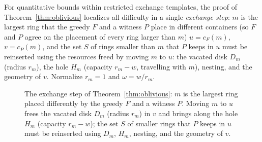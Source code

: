 \documentclass[11pt]{article}
\theoremstyle{definition}
\begin{document}
For quantitative bounds within restricted exchange templates, the proof of
Theorem~\ref{thm:oblivious} localizes all difficulty in a single
\emph{exchange step}: $m$ is the largest ring that the greedy $F$ and a
witness $P$ place in different containers (so $F$ and $P$ agree
on the placement of every ring larger than $m$) $u=c_F(m)$, $v=c_P(m)$, and the set
$S$ of rings smaller than $m$ that $P$ keeps in $u$ must be reinserted using
the resources freed by moving $m$ to $u$: the vacated disk $D_m$ (radius
$r_m$), the hole $H_m$ (capacity $r_m-w$, travelling with $m$), nesting, and
the geometry of $v$. Normalize $r_m=1$ and $\omega=w/r_m$.
\begin{figure}[ht]
\centering
{}
\caption{The exchange step of Theorem~\ref{thm:oblivious}: $m$ is the
largest ring placed differently by the greedy $F$ and a witness $P$.
Moving $m$ to $u$ frees the vacated disk $D_m$ (radius $r_m$) in $v$
and brings along the hole $H_m$ (capacity $r_m-w$); the set $S$ of
smaller rings that $P$ keeps in $u$ must be reinserted using $D_m$,
$H_m$, nesting, and the geometry of $v$.}
\label{fig:exchange}
\end{figure}
\end{document}
